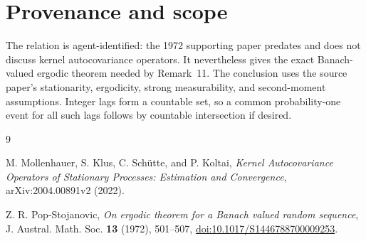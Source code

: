 \documentclass[11pt]{article}
\begin{document}
\section*{Provenance and scope}

The relation is agent-identified: the 1972 supporting paper predates and does
not discuss kernel autocovariance operators.  It nevertheless gives the exact
Banach-valued ergodic theorem needed by Remark~11.  The conclusion uses the
source paper's stationarity, ergodicity, strong measurability, and second-moment
assumptions.  Integer lags form a countable set, so a common probability-one
event for all such lags follows by countable intersection if desired.

\begin{thebibliography}{9}

M. Mollenhauer, S. Klus, C. Sch\"utte, and P. Koltai,
\emph{Kernel Autocovariance Operators of Stationary Processes: Estimation
and Convergence}, arXiv:2004.00891v2 (2022).

Z. R. Pop-Stojanovic,
\emph{On ergodic theorem for a Banach valued random sequence},
J. Austral. Math. Soc. \textbf{13} (1972), 501--507,
\href{https://doi.org/10.1017/S1446788700009253}{doi:10.1017/S1446788700009253}.

\end{thebibliography}
\end{document}
